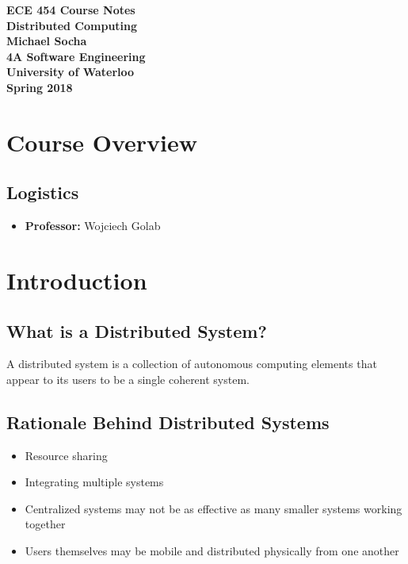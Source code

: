 \documentclass[12pt,titlepage]{article}
\begin{document}
  \begin{titlepage}
    \vspace*{\fill}
    \centering

    \textbf{\Huge ECE 454 Course Notes} \\ [0.4em]
    \textbf{\Large Distributed Computing} \\ [1em]
    \textbf{\Large Michael Socha} \\ [1em]
    \textbf{\large 4A Software Engineering} \\
    \textbf{\large University of Waterloo} \\
    \textbf{\large Spring 2018} \\
    \vspace*{\fill}
  \end{titlepage}

  \newpage 

  \tableofcontents

  \newpage

  \section{Course Overview}
    \subsection{Logistics}
      \begin{itemize}
        \item \textbf{Professor:} Wojciech Golab
      \end{itemize}

  \section{Introduction}
    \subsection{What is a Distributed System?}
      A distributed system is a collection of autonomous computing elements that appear to its users to be a single coherent system.

    \subsection{Rationale Behind Distributed Systems}
      \begin{itemize}
        \item Resource sharing
        \item Integrating multiple systems
        \item Centralized systems may not be as effective as many smaller systems working together
        \item Users themselves may be mobile and distributed physically from one another
      \end{itemize}
\end{document}
